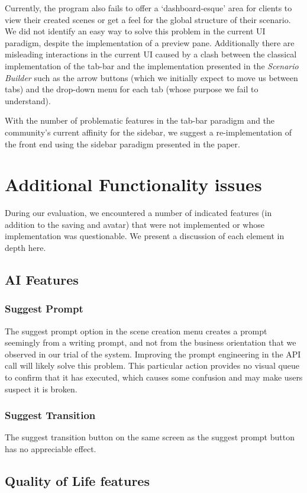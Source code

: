 \documentclass[sigconf, anonymous]{acmart} %
\begin{document}
Currently, the program also fails to offer a `dashboard-esque' area for clients to view their created scenes or get a feel for the global structure of their scenario. We did not identify an easy way to solve this problem in the current UI paradigm, despite the implementation of a preview pane. Additionally there are misleading interactions in the current UI caused by a clash between the classical implementation of the tab-bar and the implementation presented in the \textit{Scenario Builder} such as the arrow buttons (which we initially expect to move us between tabs) and the drop-down menu for each tab (whose purpose we fail to understand).

With the number of problematic features in the tab-bar paradigm and the community's current affinity for the sidebar, we suggest a re-implementation of the front end using the sidebar paradigm presented in the paper.


\section{Additional Functionality issues}
During our evaluation, we encountered a number of indicated features (in addition to the saving and avatar) that were not implemented or whose implementation was questionable. We present a discussion of each element in depth here.

\subsection{AI Features}
\subsubsection{Suggest Prompt}
The suggest prompt option in the scene creation menu creates a prompt seemingly from a writing prompt, and not from the business orientation that we observed in our trial of the system. Improving the prompt engineering in the API call will likely solve this problem. This particular action provides no visual queue to confirm that it has executed, which causes some confusion and may make users suspect it is broken.

\subsubsection{Suggest Transition}
The suggest transition button on the same screen as the suggest prompt button has no appreciable effect.

\subsection{Quality of Life features}
\end{document}
